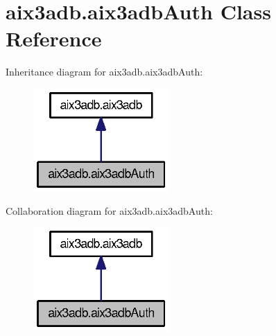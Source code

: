 \section{aix3adb.\-aix3adb\-Auth Class Reference}
\label{classaix3adb_1_1aix3adbAuth}


Inheritance diagram for aix3adb.\-aix3adb\-Auth\-:
\nopagebreak
\begin{figure}[H]
\begin{center}
\leavevmode
\includegraphics[width=146pt]{classaix3adb_1_1aix3adbAuth__inherit__graph}
\end{center}
\end{figure}


Collaboration diagram for aix3adb.\-aix3adb\-Auth\-:
\nopagebreak
\begin{figure}[H]
\begin{center}
\leavevmode
\includegraphics[width=146pt]{classaix3adb_1_1aix3adbAuth__coll__graph}
\end{center}
\end{figure}
